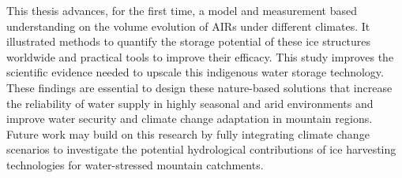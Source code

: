 This thesis advances, for the first time, a model and measurement based understanding on the volume evolution of
AIRs under different climates. It illustrated methods to quantify the storage potential of these ice structures
worldwide and practical tools to improve their efficacy. This study improves the scientific evidence needed to
upscale this indigenous water storage technology. These findings are essential to design these nature-based
solutions that increase the reliability of water supply in highly seasonal and arid environments and improve
water security and climate change adaptation in mountain regions. Future work may build on this research by
fully integrating climate change scenarios to investigate the potential hydrological contributions of ice
harvesting technologies for water-stressed mountain catchments.
